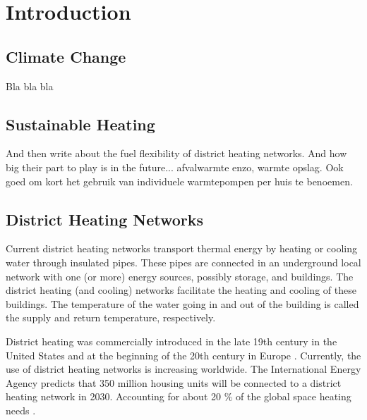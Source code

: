 %
\chapter{Introduction} \label{chap::intro}
\section{Climate Change}
Bla bla bla
\section{Sustainable Heating}
 And then write about the fuel flexibility of district heating networks. And how big their part to play is in the future... afvalwarmte enzo, warmte opslag. Ook goed om kort het gebruik van individuele warmtepompen per huis te benoemen. 

\section{District Heating Networks}
Current district heating networks transport thermal energy by heating or cooling water through insulated pipes. These pipes are connected in an underground local network with one (or more) energy sources, possibly storage, and buildings. The district heating (and cooling) networks facilitate the heating and cooling of these buildings. The temperature of the water going in and out of the building is called the supply and return temperature, respectively. 


District heating was commercially introduced in the late 19th century in the United States and at the beginning of the 20th century in Europe \cite{bookMax}. Currently, the use of district heating networks is increasing worldwide. The International Energy Agency predicts that 350 million housing units will be connected to a district heating network in 2030. Accounting for about 20 $\%$ of the global space heating needs \cite{IEAheating}. \\

